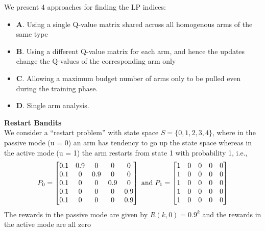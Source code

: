 \documentclass{slides}
\begin{document}
{\newpage
We present 4 approaches for finding the LP indices:
\begin{itemize}
    \vspace{-15mm}
    \item \textbf{A}. Using a single Q-value matrix shared across all homogenous arms of the same type
    \vspace{-15mm}
    \item \textbf{B}. Using a different Q-value matrix for each arm, and hence the updates change the Q-values of the corresponding arm only
    \vspace{-15mm}
    \item \textbf{C}. Allowing a maximum budget number of arms only to be pulled even during the training phase. 
    \vspace{-15mm}
    \item \textbf{D}. Single arm analysis.
\end{itemize}
\newpage
\textbf{Restart Bandits}\\
We consider a “restart problem” with state space $S = \{0, 1, 2, 3, 4\}$, where in the passive mode (u = 0) an arm has tendency to go up the state space whereas in the active mode (u = 1) the arm restarts from state
1 with probability 1, i.e.,
\begin{align*}
P_0=
\begin{bmatrix}
0.1 & 0.9 & 0&0&0\\
0.1 & 0 & 0.9 & 0 &0\\
0.1&0&0&0.9&0\\
0.1&0&0&0&0.9\\
0.1&0&0&0&0.9
\end{bmatrix}
\hspace{1mm} \text{and} \hspace{1mm}
P_1=
\begin{bmatrix}
1 & 0 & 0&0&0\\
1 & 0 & 0 & 0 &0\\
1&0&0&0&0\\
1&0&0&0&0\\
1&0&0&0&0
\end{bmatrix}
\end{align*}
The rewards in the passive mode are given by $R(k,0) = 0.9^k$ and
the rewards in the active mode are all zero
\newpage

}
\end{document}
